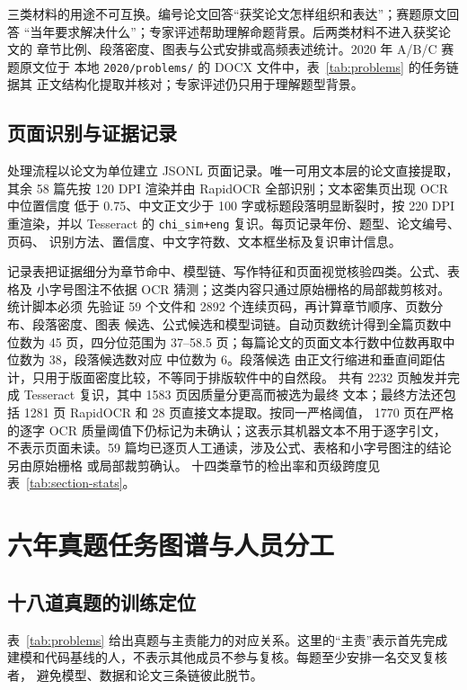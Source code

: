 \documentclass[UTF8,a4paper,12pt]{ctexart}
\begin{document}
三类材料的用途不可互换。编号论文回答“获奖论文怎样组织和表达”；赛题原文回答
“当年要求解决什么”；专家评述帮助理解命题背景。后两类材料不进入获奖论文的
章节比例、段落密度、图表与公式安排或高频表述统计。2020 年 A/B/C 赛题原文位于
本地 \texttt{2020/problems/} 的 DOCX 文件中，表~\ref{tab:problems} 的任务链据其
正文结构化提取并核对；专家评述仍只用于理解题型背景。

\subsection{页面识别与证据记录}

处理流程以论文为单位建立 JSONL 页面记录。唯一可用文本层的论文直接提取，其余
58 篇先按 120 DPI 渲染并由 RapidOCR 全部识别；文本密集页出现 OCR 中位置信度
低于 0.75、中文正文少于 100 字或标题段落明显断裂时，按 220 DPI 重渲染，并以
Tesseract 的 \texttt{chi\_sim+eng} 复识。每页记录年份、题型、论文编号、页码、
识别方法、置信度、中文字符数、文本框坐标及复识审计信息。

记录表把证据细分为章节命中、模型链、写作特征和页面视觉核验四类。公式、表格及
小字号图注不依据 OCR 猜测；这类内容只通过原始栅格的局部裁剪核对。统计脚本必须
先验证 59 个文件和 2892 个连续页码，再计算章节顺序、页数分布、段落密度、图表
候选、公式候选和模型词链。自动页数统计得到全篇页数中位数为 45 页，四分位范围为
37--58.5 页；每篇论文的页面文本行数中位数再取中位数为 38，段落候选数对应
中位数为 6。段落候选
由正文行缩进和垂直间距估计，只用于版面密度比较，不等同于排版软件中的自然段。
共有 2232 页触发并完成 Tesseract 复识，其中 1583 页因质量分更高而被选为最终
文本；最终方法还包括 1281 页 RapidOCR 和 28 页直接文本提取。按同一严格阈值，
1770 页在严格的逐字 OCR 质量阈值下仍标记为未确认；这表示其机器文本不用于逐字引文，
不表示页面未读。59 篇均已逐页人工通读，涉及公式、表格和小字号图注的结论另由原始栅格
或局部裁剪确认。
十四类章节的检出率和页级跨度见表~\ref{tab:section-stats}。

\section{六年真题任务图谱与人员分工}

\subsection{十八道真题的训练定位}

表~\ref{tab:problems} 给出真题与主责能力的对应关系。这里的“主责”表示首先完成
建模和代码基线的人，不表示其他成员不参与复核。每题至少安排一名交叉复核者，
避免模型、数据和论文三条链彼此脱节。
\end{document}
